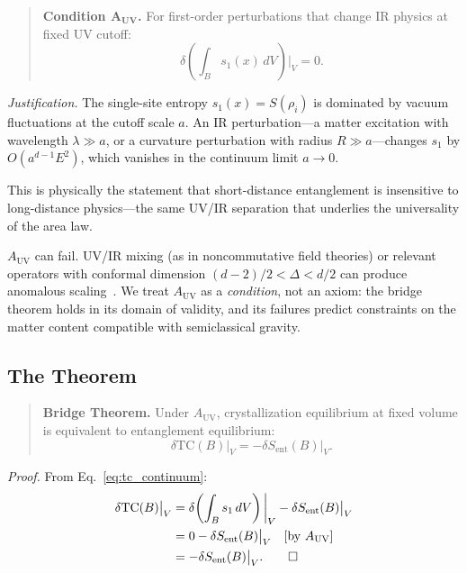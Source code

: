 \documentclass[aps,pra,twocolumn,superscriptaddress,floatfix]{revtex4-2}
\begin{document}
\begin{quote}
\textbf{Condition $\mathbf{A_{UV}}$.}
For first-order perturbations that change IR physics at fixed UV cutoff:
\begin{equation}
\delta\!\left(\int_B s_1(x) \, dV\right)\bigg|_V = 0.
\label{eq:a_uv}
\end{equation}
\end{quote}

\emph{Justification.}
The single-site entropy $s_1(x) = S(\rho_i)$ is dominated by vacuum fluctuations at the cutoff scale $a$.
An IR perturbation---a matter excitation with wavelength $\lambda \gg a$, or a curvature perturbation with radius $R \gg a$---changes $s_1$ by $O(a^{d-1} E^2)$, which vanishes in the continuum limit $a \to 0$.

This is physically the statement that short-distance entanglement is insensitive to long-distance physics---the same UV/IR separation that underlies the universality of the area law.

$A_{\mathrm{UV}}$ can fail.
UV/IR mixing (as in noncommutative field theories) or relevant operators with conformal dimension $(d-2)/2 < \Delta < d/2$ can produce anomalous scaling~\cite{casini2016}.
We treat $A_{\mathrm{UV}}$ as a \emph{condition}, not an axiom: the bridge theorem holds in its domain of validity, and its failures predict constraints on the matter content compatible with semiclassical gravity.

\subsection{The Theorem}

\begin{quote}
\textbf{Bridge Theorem.}
Under $A_{\mathrm{UV}}$, crystallization equilibrium at fixed volume is equivalent to entanglement equilibrium:
\begin{equation}
\delta\mathrm{TC}(B)\big|_V = -\delta S_{\mathrm{ent}}(B)\big|_V.
\label{eq:bridge}
\end{equation}
\end{quote}

\emph{Proof.}
From Eq.~\eqref{eq:tc_continuum}:
\begin{align}
\delta\mathrm{TC}(B)\big|_V &= \delta\!\left(\int_B s_1 \, dV\right)\bigg|_V - \delta S_{\mathrm{ent}}(B)\big|_V \notag \\
&= 0 - \delta S_{\mathrm{ent}}(B)\big|_V \quad [\text{by } A_{\mathrm{UV}}] \notag \\
&= -\delta S_{\mathrm{ent}}(B)\big|_V. \qed
\label{eq:bridge_proof}
\end{align}
\end{document}
